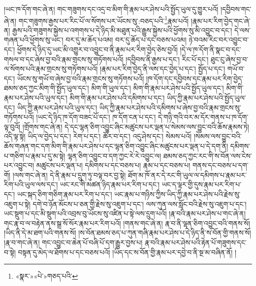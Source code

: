 །ཡང་ཁ་དོག་གང་ཞེ་ན། གང་གཟུགས་དང་འདྲ་བ་མིག་གི་རྣམ་པར་ཤེས་པའི་སྤྱོད་ཡུལ་དུ་གྱུར་པའོ། །དབྱིབས་གང་ཞེ་ན། གང་གཟུགས་རྒྱས་པར་རིང་པོ་ལ་སོགས་པར་ཡོངས་སུ་:བཅད་པའི་\footnote{«སྣར་»«པེ་»གཅད་པའི་}རྣམ་པའོ། །རྣམ་པར་རིག་བྱེད་གང་ཞེ་ན། རྒྱས་པའི་གཟུགས་སྐྱེས་པ་འགགས་པ་དེ་ཉིད་མི་མཐུན་པའི་རྒྱུས་སྐྱེས་པའི་ཕྱོགས་སུ་མི་འབྱུང་བ་དང་། དེ་ལས་གཞན་པའི་ཕྱོགས་སུ་ཡང་། བར་དུ་མ་ཆོད་པའམ། བར་དུ་ཆོད་པ་དང་བཅས་པའམ། ཉེ་བའམ་རིང་བར་འབྱུང་བ་དང་། ཕྱོགས་དེ་ཉིད་དུ་ཡང་མི་འགྱུར་བ་འབྱུང་བ་ནི་རྣམ་པར་རིག་བྱེད་ཅེས་བྱའོ། །དེ་ལ་ཁ་དོག་ནི་སྣང་བ་དང་གསལ་བ་དང་ཞེས་བྱ་བའི་རྣམ་གྲངས་སུ་གཏོགས་པའོ། །དབྱིབས་ནི་རྒྱས་པ་དང་། རིང་པོ་དང་། ཐུང་ངུ་ཞེས་བྱ་བ་ལ་སོགས་པའི་རྣམ་གྲངས་སུ་གཏོགས་པའོ། །རྣམ་པར་རིག་བྱེད་ནི་ལས་དང་བྱེད་པ་དང་། སྤྱོད་པ་དང་། གཡོ་བ་དང་། ཡོངས་སུ་གཡོ་བ་ཞེས་བྱ་བའི་རྣམ་གྲངས་སུ་གཏོགས་པའོ། །ཁ་དོག་དང་དབྱིབས་དང་རྣམ་པར་རིག་བྱེད་ཐམས་ཅད་ཀྱང་མིག་གི་སྤྱོད་ཡུལ་དང་། མིག་གི་ཡུལ་དང་། མིག་གི་རྣམ་པར་ཤེས་པའི་སྤྱོད་ཡུལ་དང་། མིག་གི་རྣམ་པར་ཤེས་པའི་ཡུལ་དང་། མིག་གི་རྣམ་པར་ཤེས་པའི་དམིགས་པ་དང་། ཡིད་ཀྱི་རྣམ་པར་ཤེས་པའི་སྤྱོད་ཡུལ་དང་། ཡིད་ཀྱི་རྣམ་པར་ཤེས་པའི་ཡུལ་དང་། ཡིད་ཀྱི་རྣམ་པར་ཤེས་པའི་དམིགས་པ་ཞེས་བྱ་བའི་རྣམ་གྲངས་སུ་གཏོགས་པའོ། །ཡང་དེ་ཉིད་ཁ་དོག་བཟང་པོ་དང་། ཁ་དོག་ངན་པ་དང་། དེ་གཉི་གའི་བར་མ་དོར་གནས་པ་ཁ་དོག་ལྟ་བུའོ། །གྲོགས་གང་ཞེ་ན། དེ་དང་ལྷན་ཅིག་འབྱུང་ཞིང་མཚུངས་པར་ལྡན་པ་སེམས་ལས་བྱུང་བའི་ཆོས་རྣམས་ཏེ། འདི་ལྟ་སྟེ། ཡིད་ལ་བྱེད་པ་དང་། རེག་པ་དང་། ཚོར་བ་དང་། འདུ་ཤེས་དང་། སེམས་པའོ། །སེམས་ལས་བྱུང་བའི་ཆོས་གཞན་གང་དག་མིག་གི་རྣམ་པར་ཤེས་པ་དང་ལྷན་ཅིག་འབྱུང་ཞིང་མཚུངས་པར་ལྡན་པ་དེ་དག་ནི། དམིགས་པ་གཅིག་པ་རྣམ་པ་དུ་མ་སྟེ། ལྷན་ཅིག་འབྱུང་བ་དག་ཀྱང་རེ་རེ་འབྱུང་ལ། ཐམས་ཅད་ཀྱང་རང་གི་ས་བོན་ལས་ངེས་པར་འབྱུང་བ། མཚུངས་པར་ལྡན་པ། དམིགས་པ་དང་བཅས་པ། རྣམ་པ་དང་བཅས་པ། གནས་དང་བཅས་པ་དག་གོ། །ལས་གང་ཞེ་ན། དེ་ནི་རྣམ་པ་དྲུག་ཏུ་བལྟ་བར་བྱ་སྟེ། ཐོག་མ་ཁོ་ནར་དེ་རང་གི་ཡུལ་ལ་དམིགས་པ་རྣམ་པར་རིག་པའི་ཡུལ་ལས་དང་། ཡང་རང་གི་མཚན་ཉིད་རྣམ་པར་རིག་པ་དང་། ཡང་ད་ལྟར་གྱི་དུས་རྣམ་པར་རིག་པ་དང་། ཡང་སྐད་ཅིག་གཅིག་རྣམ་པར་རིག་པ་དང་། ཡང་རྣམ་པ་གཉིས་ཀྱིས་ཡིད་ཀྱི་རྣམ་པར་ཤེས་པའི་རྗེས་སུ་འཇུག་པ་སྟེ། དགེ་བ་ཉོན་མོངས་པ་ཅན་གྱི་རྗེས་སུ་འཇུག་པ་དང་། ལས་ཀུན་ལས་སློང་བའི་རྗེས་སུ་འཇུག་པ་དང་། ཡང་སྡུག་པ་དང་མི་སྡུག་པའི་འབྲས་བུ་ཡོངས་སུ་འཛིན་པ་སྟེ་ལས་དྲུག་པའོ། །རྣ་བའི་རྣམ་པར་ཤེས་པ་གང་ཞེ་ན། གང་རྣ་བ་ལ་བརྟེན་ནས་སྒྲ་སོ་སོར་རྣམ་པར་རིག་པའོ། །གནས་གང་ཞེ་ན། རྣ་བ་ནི་ལྷན་ཅིག་འབྱུང་བའི་གནས་སོ། །ཡིད་ནི་དེ་མ་ཐག་པའི་གནས་སོ། །ས་བོན་ཐམས་ཅད་པ་ཀུན་གཞི་རྣམ་པར་ཤེས་པ་དེ་ཉིད་ནི་ས་བོན་གྱི་གནས་སོ། །རྣ་བ་གང་ཞེ་ན། གང་འབྱུང་བ་ཆེན་པོ་བཞི་པོ་དག་རྒྱུར་བྱས་པ། རྣ་བའི་རྣམ་པར་ཤེས་པའི་རྟེན་པོ་གཟུགས་དང་བ་སྟེ། བསྟན་དུ་མེད་ལ་ཐོགས་པ་དང་བཅས་པའོ། །ཡིད་དང་ས་བོན་གྱི་རྣམ་པར་དབྱེ་བ་ནི་སྔ་མ་བཞིན་ནོ། །
